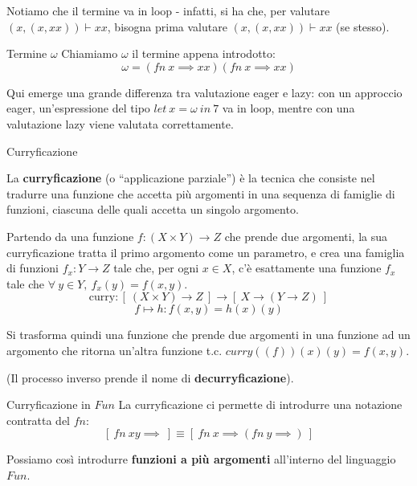 \documentclass[a4paper,11pt]{report}
\begin{document}
Notiamo che il termine va in loop - infatti, si ha che, per valutare \((x, (x,xx))\vdash  xx \), bisogna prima valutare \((x, (x,xx))\vdash  xx \) (se stesso).

\begin{gbox}{Termine \( \omega \)}
    Chiamiamo \( \omega \) il termine appena introdotto:
    \[ \omega =  (fn \ x \implies xx)(fn \ x \implies xx) \]

\end{gbox}

Qui emerge una grande differenza tra valutazione eager e lazy: con un approccio eager, un'espressione del tipo \( let \ x = \omega \ in \ 7 \) va in loop, mentre con una valutazione lazy viene valutata correttamente.


\begin{defbox}{Curryficazione}{}

    La \textbf{curryficazione} (o ``applicazione parziale'') è la tecnica che consiste nel tradurre una funzione che accetta più argomenti in una sequenza di famiglie di funzioni, ciascuna delle quali accetta un singolo argomento.


    Partendo da una funzione \( f: (X \times Y) \to Z\) che prende due argomenti, la sua curryficazione tratta il primo argomento come un parametro, e crea una famiglia di funzioni \( f_x : Y \to Z \) tale che, per ogni \( x \in X  \), c'è esattamente una funzione \( f_x \) tale che \( \forall \ y \in Y , \  f_x(y)=f(x,y)\).
    \[ \text{curry}: [ \ (X \times Y) \to Z \ ] \to [ \ X \to (Y \to Z) \ ]\]
    \[ f \mapsto h : f(x, y) = h(x)(y) \]


Si trasforma quindi una funzione che prende due argomenti in una funzione ad un argomento che ritorna un'altra funzione t.c. \( curry((f))(x)(y) = f(x, y) \).

(Il processo inverso prende il nome di \textbf{decurryficazione}).

\end{defbox}

\begin{gbox}[colback=DeepGreenLight, colframe=DeepGreen, colbacktitle=DeepGreen]{Curryficazione in \( Fun \)}
    La curryficazione ci permette di introdurre una notazione contratta del \( fn \):
    \[ [ \ fn \ x y \implies \ ] \equiv [ \ fn \ x \implies ( fn \ y \implies ) \ ]\]

    Possiamo così introdurre \textbf{funzioni a più argomenti} all'interno del linguaggio \( Fun \).

\end{gbox}
\end{document}
